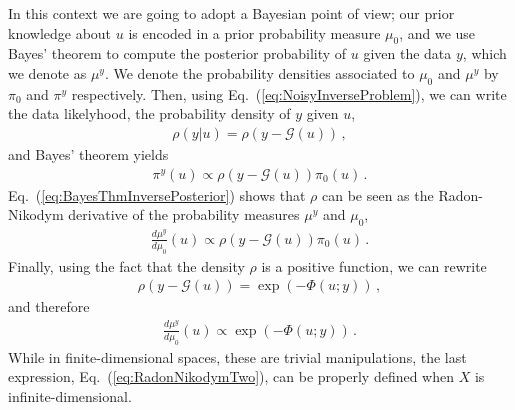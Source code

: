 In this context we are going to adopt a Bayesian point of view; our
prior knowledge about $u$ is encoded in a prior probability measure
$\mu_0$, and we use Bayes' theorem to compute the posterior
probability of $u$ given the data $y$, which we denote as $\mu^y$. We
denote the probability densities associated to $\mu_0$ and $\mu^y$ by
$\pi_0$ and $\pi^y$ respectively. Then, using
Eq.~(\ref{eq:NoisyInverseProblem}), we can write the data likelyhood,
\ie the probability density of $y$ given $u$,
\begin{align}
  \label{eq:YGivenUProbDensity}
  \rho(y|u) = \rho(y-\mathcal G(u))\, ,
\end{align}
and Bayes' theorem yields
\begin{align}
  \label{eq:BayesThmInversePosterior}
  \pi^y(u) \propto \rho(y-\mathcal G(u)) \pi_0(u)\, .
\end{align}
Eq.~(\ref{eq:BayesThmInversePosterior}) shows that $\rho$ can be seen
as the Radon-Nikodym derivative of the probability measures $\mu^y$
and $\mu_0$, \viz 
\begin{align}
  \label{eq:RadonNikodym}
  \frac{d\mu^y}{d\mu_0} (u) \propto \rho(y-\mathcal G(u)) \pi_0(u)\, .
\end{align}
Finally, using the fact that the density $\rho$ is a positive
function, we can rewrite 
\begin{align}
  \label{eq:PotentialDef}
  \rho(y-\mathcal G(u)) = \exp\left(-\Phi(u;y)\right)\, ,
\end{align}
and therefore
\begin{align}
  \label{eq:RadonNikodymTwo}
  \frac{d\mu^y}{d\mu_0} (u) \propto \exp\left(-\Phi(u;y)\right)\, .
\end{align}
While in finite-dimensional spaces, these are trivial manipulations,
the last expression, Eq.~(\ref{eq:RadonNikodymTwo}), can be
properly defined when $X$ is infinite-dimensional.
